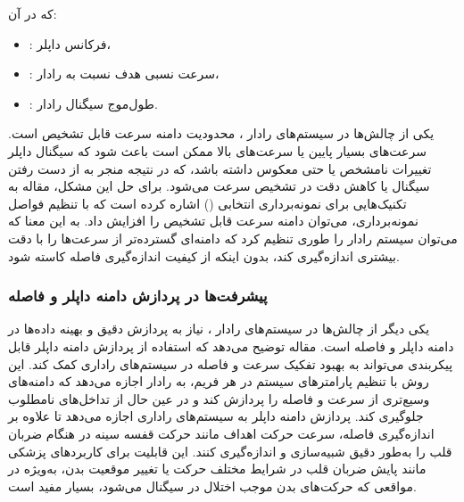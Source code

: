 که در آن:
\begin{itemize}
    \item {}: فرکانس داپلر،
    \item {}: سرعت نسبی هدف نسبت به رادار،
    \item \lr{$\lambda$}: طول‌موج سیگنال رادار.
\end{itemize}

یکی از چالش‌ها در سیستم‌های رادار ، محدودیت دامنه سرعت قابل تشخیص است. سرعت‌های بسیار پایین یا سرعت‌های بالا ممکن است باعث شود که سیگنال داپلر تغییرات نامشخص یا حتی معکوس داشته باشد، که در نتیجه منجر به از دست رفتن سیگنال یا کاهش دقت در تشخیص سرعت می‌شود.
برای حل این مشکل، مقاله \cite{kwak2024adjusting} به تکنیک‌هایی برای نمونه‌برداری انتخابی () اشاره کرده است که با تنظیم فواصل نمونه‌برداری، می‌توان دامنه سرعت قابل تشخیص را افزایش داد. به این معنا که می‌توان سیستم رادار را طوری تنظیم کرد که دامنه‌ای گسترده‌تر از سرعت‌ها را با دقت بیشتری اندازه‌گیری کند، بدون اینکه از کیفیت اندازه‌گیری فاصله کاسته شود.


\subsubsection{پیشرفت‌ها در پردازش دامنه داپلر و فاصله} %
\label{sec:advanced-range-doppler-processing}

یکی دیگر از چالش‌ها در سیستم‌های رادار ، نیاز به پردازش دقیق و بهینه داده‌ها در دامنه داپلر و فاصله است. مقاله \cite{neemat2019reconfigurable}  توضیح می‌دهد که استفاده از پردازش دامنه داپلر قابل پیکربندی می‌تواند به بهبود تفکیک سرعت و فاصله در سیستم‌های راداری  کمک کند. این روش با تنظیم پارامترهای سیستم در هر فریم، به رادار اجازه می‌دهد که دامنه‌های وسیع‌تری از سرعت و فاصله را پردازش کند و در عین حال از تداخل‌های نامطلوب جلوگیری کند.
پردازش دامنه داپلر به سیستم‌های راداری اجازه می‌دهد تا علاوه بر اندازه‌گیری فاصله، سرعت حرکت اهداف مانند حرکت قفسه سینه در هنگام ضربان قلب را به‌طور دقیق شبیه‌سازی و اندازه‌گیری کنند. این قابلیت برای کاربردهای پزشکی مانند پایش ضربان قلب در شرایط مختلف حرکت یا تغییر موقعیت بدن، به‌ویژه در مواقعی که حرکت‌های بدن موجب اختلال در سیگنال می‌شود، بسیار مفید است.




